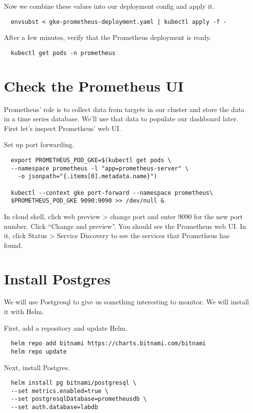 \documentclass{article}
\begin{document}
Now we combine these values into our deployment config and apply it.

\begin{verbatim}
  envsubst < gke-prometheus-deployment.yaml | kubectl apply -f -
\end{verbatim}

After a few minutes, verify that the Prometheus deployment is ready.

\begin{verbatim}
  kubectl get pods -n prometheus
\end{verbatim}

\section{Check the Prometheus UI}
Prometheus' role is to collect data from targets in our cluster and store the data in a time series database. We'll use that data to populate our dashboard later. First let's inspect Prometheus' web UI.

Set up port forwarding.
\begin{verbatim}
  export PROMETHEUS_POD_GKE=$(kubectl get pods \
  --namespace prometheus -l "app=prometheus-server" \
    -o jsonpath="{.items[0].metadata.name}")
    
  kubectl --context gke port-forward --namespace prometheus\
  $PROMETHEUS_POD_GKE 9090:9090 >> /dev/null &
\end{verbatim}

In cloud shell, click web preview > change port and enter 9090 for the new port number. Click ``Change and preview''. You should see the Prometheus web UI. In it, click Status > Service Discovery to see the services that Prometheus has found.

\section{Install Postgres}
We will use Postgresql to give us something interesting to monitor. We will install it with Helm.

First, add a repository and update Helm.
\begin{verbatim}
  helm repo add bitnami https://charts.bitnami.com/bitnami
  helm repo update
\end{verbatim}

Next, install Postgres.
\begin{verbatim}
  helm install pg bitnami/postgresql \
  --set metrics.enabled=true \
  --set postgresqlDatabase=prometheusdb \
  --set auth.database=labdb 
\end{verbatim}
\end{document}
